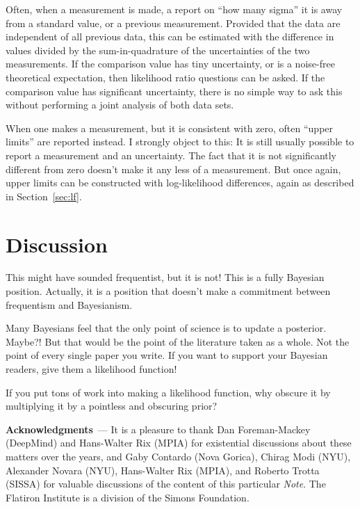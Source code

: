 \documentclass{article}
\renewcommand{\paragraph}[1]{\bigskip\par\noindent\textbf{#1}~---}
\newcommand{\documentname}{\textsl{Note}}
\newcommand{\sectionname}{Section}
\newcommand{\secref}[1]{\sectionname~\ref{#1}}
\begin{document}
Often, when a measurement is made, a report on ``how many sigma'' it is away from a standard value, or a previous measurement.
Provided that the data are independent of all previous data, this can be estimated with the difference in values divided by the sum-in-quadrature of the uncertainties of the two measurements.
If the comparison value has tiny uncertainty, or is a noise-free theoretical expectation, then likelihood ratio questions can be asked.
If the comparison value has significant uncertainty, there is no simple way to ask this without performing a joint analysis of both data sets.

When one makes a measurement, but it is consistent with zero, often ``upper limits'' are reported instead.
I strongly object to this: It is still usually possible to report a measurement and an uncertainty.
The fact that it is not significantly different from zero doesn't make it any less of a measurement.
But once again, upper limits can be constructed with log-likelihood differences, again as described in \secref{sec:lf}.

\section{Discussion}\label{sec:discussion}
This might have sounded frequentist, but it is not!
This is a fully Bayesian position.
Actually, it is a position that doesn't make a commitment between frequentism and Bayesianism.

Many Bayesians feel that the only point of science is to update a posterior. Maybe?! But that would be the point of the literature taken as a whole. Not the point of every single paper you write.
If you want to support your Bayesian readers, give them a likelihood function!

If you put tons of work into making a likelihood function, why obscure it by multiplying it by a pointless and obscuring prior?

\paragraph{Acknowledgments}
It is a pleasure to thank
  Dan Foreman-Mackey (DeepMind) and
  Hans-Walter Rix (MPIA)
for existential discussions about these matters over the years, and
  Gaby Contardo (Nova Gorica),
  Chirag Modi (NYU),
  Alexander Novara (NYU),
  Hans-Walter Rix (MPIA), and
  Roberto Trotta (SISSA)
for valuable discussions of the content of this particular \documentname.
The Flatiron Institute is a division of the Simons Foundation.

\raggedright\footnotesize


\end{document}

